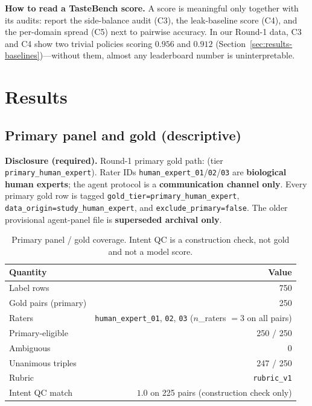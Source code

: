 \documentclass[11pt,a4paper]{article}
\begin{document}
\textbf{How to read a TasteBench score.} A score is meaningful only together with its audits: report the side-balance audit (C3), the leak-baseline score (C4), and the per-domain spread (C5) next to pairwise accuracy. In our Round-1 data, C3 and C4 show two trivial policies scoring $0.956$ and $0.912$ (Section~\ref{sec:results-baselines})---without them, almost any leaderboard number is uninterpretable.

\section{Results}
\label{sec:results}

\subsection{Primary panel and gold (descriptive)}
\label{sec:results-panel}

\textbf{Disclosure (required).} Round-1 primary gold path:  (tier \texttt{primary\_human\_expert}). Rater IDs \texttt{human\_expert\_01}/\texttt{02}/\texttt{03} are \textbf{biological human experts}; the agent protocol is a \textbf{communication channel only}. Every primary gold row is tagged \texttt{gold\_tier=primary\_human\_expert}, \texttt{data\_origin=study\_human\_expert}, and \texttt{exclude\_primary=false}. The older provisional agent-panel file is \textbf{superseded archival only}.

\begin{table}[t]
\centering
\small
\begin{tabular}{@{}lr@{}}
\toprule
Quantity & Value \\
\midrule
Label rows & 750 \\
Gold pairs (primary) & 250 \\
Raters & \texttt{human\_expert\_01}, \texttt{02}, \texttt{03} ($n$\_raters $=3$ on all pairs) \\
Primary-eligible & 250 / 250 \\
Ambiguous & 0 \\
Unanimous triples & 247 / 250 \\
Rubric & \texttt{rubric\_v1} \\
Intent QC match & $1.0$ on 225 pairs (construction check only) \\
\bottomrule
\end{tabular}
\caption{Primary panel / gold coverage. Intent QC is a construction check, not gold and not a model score.}
\label{tab:panel}
\end{table}
\end{document}
